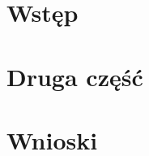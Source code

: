 \documentclass[12pt]{oska}
\affiliation{Akademia Górniczo-Hutnicza w Krakowie}
\let\Oldsection\section
\renewcommand{\section}{\FloatBarrier\Oldsection}
\begin{document}
\maketitles

\section{Wstęp}



\section{Druga część}

\section{Wnioski}

\printbibliography
\end{document}
